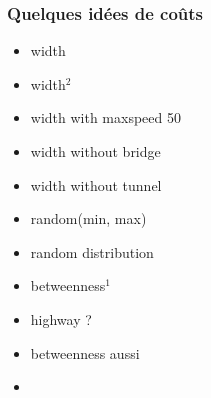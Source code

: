 \documentclass[aspectratio=169]{beamer}
\begin{document}
    \begin{frame}
        \frametitle{Quelques idées de coûts}
        \begin{itemize}
            \item width
            \item width$^2$
            \item width with maxspeed 50
            \item width without bridge
            \item width without tunnel
            \item random(min, max)
            \item random distribution
            \item betweenness$^1$
            \item highway ?
            \item betweenness aussi
            \item 
        \end{itemize}
    \end{frame}
\end{document}
